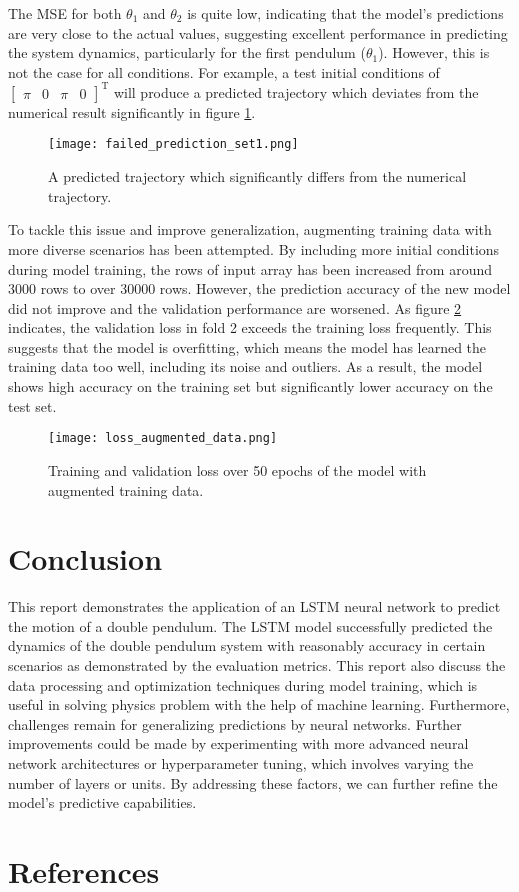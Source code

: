 \documentclass[12pt]{article}
\begin{document}
\noindent The MSE for both $\theta_1$ and $\theta_2$ is quite low, indicating that the model's predictions are very close to the actual values, suggesting excellent performance in predicting the system dynamics, 
particularly for the first pendulum ($\theta_1$). However, this is not the case for all conditions. For example, a test initial conditions of $ \begin{bmatrix} \pi & 0 & \pi & 0 \end{bmatrix}^\mathrm{T} $ will produce a predicted trajectory which deviates from 
the numerical result significantly in figure \ref*{fig:failed_prediction_set1}.

\begin{figure}[H]
    \centering
    \texttt{[image: failed\_prediction\_set1.png]}
    \caption{A predicted trajectory which significantly differs from the numerical trajectory.}
    \label{fig:failed_prediction_set1}
\end{figure}

\noindent To tackle this issue and improve generalization, augmenting training data with more diverse scenarios has been attempted. By including more initial conditions during model training, the rows of input array has been increased 
from around 3000 rows to over 30000 rows. However, the prediction accuracy of the new model did not improve and the validation performance are worsened. As figure \ref*{fig:loss_augmented_data} indicates, the 
validation loss in fold 2 exceeds the training loss frequently. This suggests that the model is overfitting, which means the model has learned the training data too well, including its noise and outliers. As a result, the model shows high accuracy on the training set but 
significantly lower accuracy on the test set\cite{hossain2023machine}.

\begin{figure}[H]
    \centering
    \texttt{[image: loss\_augmented\_data.png]}
    \caption{Training and validation loss over 50 epochs of the model with augmented training data.}
    \label{fig:loss_augmented_data}
\end{figure}
\section{Conclusion}
This report demonstrates the application of an LSTM neural network to predict the motion of a double pendulum. 
The LSTM model successfully predicted the dynamics of the double pendulum system with reasonably accuracy in certain scenarios as demonstrated by the evaluation metrics. 
This report also discuss the data processing and optimization techniques during model training, which is useful in solving physics problem with the help of machine learning.
Furthermore, challenges remain for generalizing predictions by neural networks. Further improvements could be made by experimenting with more advanced neural network architectures or 
hyperparameter tuning, which involves varying the number of layers or units. By addressing these factors, we can further refine the model's predictive capabilities.

\section{References}
{}

\end{document}
